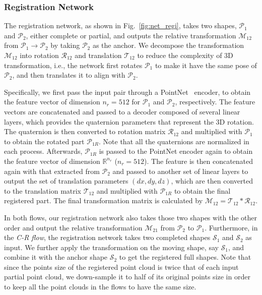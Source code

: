 
\subsubsection{Registration Network}

The registration network, as shown in Fig.~\ref{fig:net_regi}, takes two shapes, $\mathcal{P}_1$ and $\mathcal{P}_2$, either complete or partial, and outputs the relative transformation $\mathcal{M}_{12}$ from $\mathcal{P}_1 \rightarrow \mathcal{P}_2$ by taking $\mathcal{P}_2$ as the anchor. 	
We decompose the transformation $\mathcal{M}_{12}$ into rotation $\mathcal{R}_{12}$ and translation $\mathcal{T}_{12}$ to reduce the complexity of 3D transformation, i.e., the network first rotates $\mathcal{P}_1$ to make it have the same pose of $\mathcal{P}_2$, and then translates it to align with $\mathcal{P}_2$.
 
Specifically, we first pass the input pair through a PointNet~\cite{qi2017pointnet} encoder, to obtain the feature vector of dimension $n_r=512$ for $\mathcal{P}_1$ and $\mathcal{P}_2$, respectively. The feature vectors are concatenated and passed to a decoder composed of several linear layers, which provides the quaternion parameters that represent the 3D rotation. The quaternion is then converted to rotation matrix $\mathcal{R}_{12}$ and multiplied with $\mathcal{P}_1$ to obtain the rotated part $\mathcal{P}_{1R}$. Note that all the quaternions are normalized in each process. Afterwards, $\mathcal{P}_{1R}$ is passed to the PointNet encoder again to obtain the feature vector of dimension $\mathbb{R}^{n_r}$ ($n_r=512$). The feature is then concatenated again with that extracted from $\mathcal{P}_{2}$ and passed to another set of linear layers to output the set of translation parameters $(dx, dy, dz)$, which are then converted to the translation matrix $\mathcal{T}_{12}$ and multiplied with $\mathcal{P}_{1R}$ to obtain the final registered part. The final transformation matrix is calculated by $\mathcal{M}_{12} = \mathcal{T}_{12} * \mathcal{R}_{12}$.

In both flows, our registration network also takes those two shapes with the other order and output the relative transformation $\mathcal{M}_{21}$ from $\mathcal{P}_2$ to $\mathcal{P}_1$.
Furthermore, in the \textit{C-R flow}, the registration network takes two completed shapes $\mathcal{S}_1$ and $\mathcal{S}_2$ as input. We further apply the transformation on the moving shape, say $\mathcal{S}_1$, and combine it with the anchor shape $\mathcal{S}_2$ to get the registered full shapes. 
Note that since the points size of the registered point cloud is twice that of each input partial point cloud, we down-sample it to half of its original points size in order to keep all the point clouds in the flows to have the same size.

